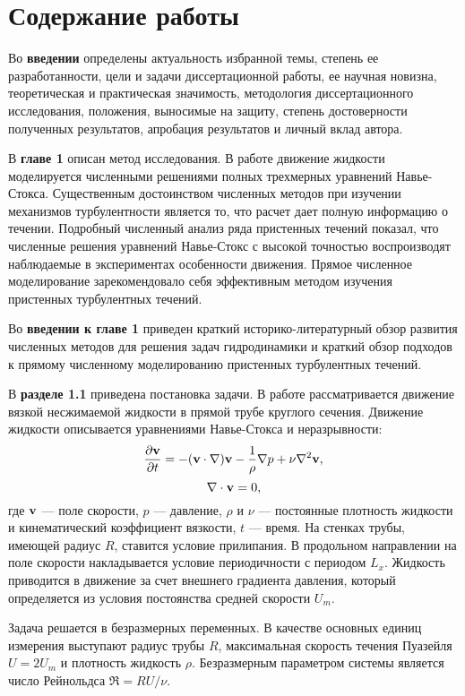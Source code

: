 \section*{\centering Содержание работы}

Во \textbf{введении} определены актуальность избранной темы, степень ее разработанности, цели и задачи диссертационной работы, ее научная новизна, теоретическая и практическая значимость, методология диссертационного исследования, положения, выносимые на защиту, степень достоверности полученных результатов, апробация результатов и личный вклад автора. 

В {\bf главе 1} описан метод исследования. В работе движение жидкости моделируется численными решениями полных трехмерных уравнений Навье-Стокса. Существенным достоинством численных методов при изучении механизмов турбулентности является то, что расчет дает полную информацию о течении. Подробный численный анализ ряда пристенных течений показал, что численные решения уравнений Навье-Стокс с высокой точностью воспроизводят наблюдаемые в экспериментах особенности движения. Прямое численное моделирование зарекомендовало себя эффективным методом изучения пристенных турбулентных течений. 

Во \textbf{введении к главе 1} приведен краткий историко-литературный обзор развития численных методов для решения задач гидродинамики и краткий обзор подходов к прямому численному моделированию пристенных турбулентных течений. 

В \textbf{разделе 1.1} приведена постановка задачи. В работе рассматривается движение вязкой несжимаемой жидкости в прямой трубе круглого сечения. Движение жидкости описывается уравнениями Навье-Стокса и неразрывности:
$$
\frac{\partial \mathbf{v}}{\partial t} = - (\mathbf{v} \cdot \nabla) \mathbf{v} - \frac{1}{\rho}\nabla p + \nu \nabla^2 \mathbf{v},
$$
$$
\nabla \cdot \mathbf{v} = 0,
$$
где $\mathbf{v}$ --- поле скорости, $p$ --- давление, $\rho$ и $\nu$ --- постоянные плотность жидкости и кинематический коэффициент вязкости, $t$ --- время. 
На стенках трубы, имеющей радиус $R$, ставится условие прилипания. В продольном направлении на поле скорости накладывается условие периодичности с периодом $L_x$. Жидкость приводится в движение за счет внешнего градиента давления, который определяется из условия постоянства средней скорости $U_m$. 

Задача решается в безразмерных переменных. В качестве основных единиц измерения выступают радиус трубы $R$, максимальная скорость течения Пуазейля $U = 2U_m$ и плотность жидкость $\rho$. Безразмерным параметром системы является число Рейнольдса $ \Re = {R U}/{\nu}$.

